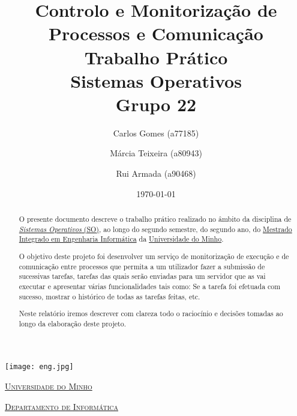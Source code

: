 \documentclass[a4paper]{article}
\begin{document}
\title{\textbf{Controlo e Monitorização de Processos e Comunicação}\\Trabalho Prático\\ Sistemas Operativos\\Grupo 22}
\author{Carlos Gomes (a77185) \and Márcia Teixeira (a80943) \and Rui Armada (a90468)}
\date{\today}

\begin{titlepage}

  \thispagestyle{empty}
  \begin{center}
  \begin{minipage}{0.75\linewidth}
      \centering
      \texttt{[image: eng.jpg]}\par\vspace{1cm}
      \vspace{1.5cm}
      \href{https://www.uminho.pt/PT}{\scshape\LARGE Universidade do Minho} \par
      \vspace{1cm}
      \href{https://www.di.uminho.pt/}{\scshape\Large Departamento de Informática} \par
      \vspace{1.5cm}

  \maketitle
  \end{minipage}
  \end{center}

  \clearpage

 \end{titlepage}
 
 \begin{abstract}

O presente documento descreve o trabalho prático realizado no âmbito da disciplina de
\href{http://miei.di.uminho.pt/plano_estudos.html#sistemas_operativos}
{\emph {Sistemas Operativos} (SO)}, ao longo do segundo semestre,
do segundo ano, do \href{http://miei.di.uminho.pt}{Mestrado Integrado em Engenharia Informática}
da \href{https://www.uminho.pt}{Universidade do Minho}.

O objetivo deste projeto foi desenvolver um serviço de monitorização de execução e de comunicação entre processos que permita a um utilizador fazer a submissão de sucessivas tarefas, tarefas das quais serão enviadas para um servidor que as vai executar e apresentar várias funcionalidades tais como: Se a tarefa foi efetuada com sucesso, mostrar o histórico de todas as tarefas feitas, etc.

Neste relatório iremos descrever com clareza todo o raciocínio e decisões tomadas ao longo da elaboração deste projeto.

\end{abstract}
\end{document}
